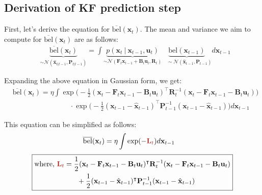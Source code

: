 \documentclass[10pt]{article}
\begin{document}
\subsection{Derivation of KF prediction step}
First, let's derive the equation for $\overline{\text{bel}}(\mathbf{x}_{t})$. The mean and variance we aim to compute for $\overline{\text{bel}}(\mathbf{x}_{t})$ are as follows:
\begin{equation} 
	\begin{aligned} 
		& \underbrace{\overline{\text{bel}}(\mathbf{x}_{t})}_{\sim \mathcal{N}(\hat{\mathbf{x}}_{t|t-1}, \mathbf{P}_{t|t-1})  }  = \int \underbrace{  p(\mathbf{x}_{t} \ | \ \mathbf{x}_{t-1}, \mathbf{u}_{t})  }_{\sim \mathcal{N}(\mathbf{F}_t\mathbf{x}_{t-1}+\mathbf{B}_t \mathbf{u}_t, \mathbf{R}_{t})} \underbrace{\text{bel}(\mathbf{x}_{t-1})}_{\quad \sim \mathcal{N}(\hat{\mathbf{x}}_{t-1}, \mathbf{P}_{t-1})} d \mathbf{x}_{t-1}
	\end{aligned} 
\end{equation}

Expanding the above equation in Gaussian form, we get:
\begin{equation} 
	\begin{aligned} 
		& \overline{\text{bel}}(\mathbf{x}_{t}) = \eta \int \exp \Big(-\frac{1}{2}(\mathbf{x}_t - \mathbf{F}_t\mathbf{x}_{t-1}-\mathbf{B}_t\mathbf{u}_t)^{\intercal} \mathbf{R}_t^{-1}(\mathbf{x}_t - \mathbf{F}_t\mathbf{x}_{t-1}-\mathbf{B}_t\mathbf{u}_t) \Big) \\
		& \qquad\qquad\qquad\qquad \cdot \exp \Big( -\frac{1}{2}(\mathbf{x}_{t-1} - \hat{\mathbf{x}}_{t-1})^{\intercal} \mathbf{P}_{t-1}^{-1}(\mathbf{x}_{t-1} - \hat{\mathbf{x}}_{t-1}) \Big) d \mathbf{x}_{t-1}
	\end{aligned} 
\end{equation}

This equation can be simplified as follows:
\begin{equation} 
	\begin{aligned} 
		& \overline{\text{bel}}(\mathbf{x}_{t}) = \eta \int \exp(- {\color{Mahogany} \mathbf{L}_{t} } ) d \mathbf{x}_{t-1}
	\end{aligned} 
\end{equation}
\begin{equation}  \label{eq:derivkf1}
	\boxed{ \begin{aligned} 
			& \text{where, } {\color{Mahogany} \mathbf{L}_t }= \frac{1}{2}(\mathbf{x}_t - \mathbf{F}_t\mathbf{x}_{t-1}-\mathbf{B}_t\mathbf{u}_t)^{\intercal} \mathbf{R}_t^{-1}(\mathbf{x}_t - \mathbf{F}_t\mathbf{x}_{t-1}-\mathbf{B}_t\mathbf{u}_t) \\ 
			& \qquad\qquad\qquad + \frac{1}{2}(\mathbf{x}_{t-1} - \hat{\mathbf{x}}_{t-1})^{\intercal} \mathbf{P}_{t-1}^{-1}(\mathbf{x}_{t-1} - \hat{\mathbf{x}}_{t-1})
	\end{aligned}  }
\end{equation}
\end{document}
